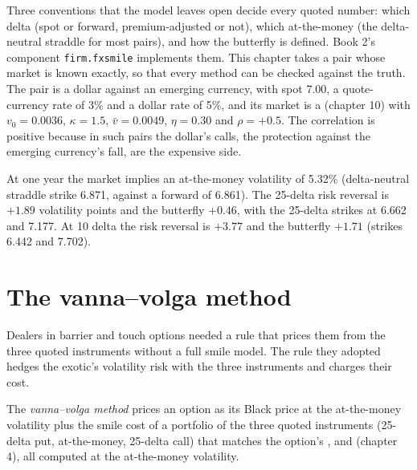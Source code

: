 Three conventions that the model leaves open decide every quoted number: which delta (spot or forward, premium-adjusted or not),
which at-the-money (the delta-neutral straddle for most pairs), and how the butterfly is defined. Book 2's component
\texttt{firm.fxsmile} implements them. This chapter takes a pair whose market is known exactly, so that every method can be checked
against the truth. The pair is a dollar against an emerging currency, with spot 7.00, a quote-currency rate of 3\% and a dollar rate
of 5\%, and its market is a  (chapter 10) with $v_0=0.0036$, $\kappa=1.5$, $\bar v=0.0049$, $\eta=0.30$ and $\rho=+0.5$. The
correlation is positive because in such pairs the dollar's calls, the protection against the emerging currency's fall, are the
expensive side.

\begin{example}\label{ex:dv:fx-derivatives:quotes}
At one year the market implies an at-the-money volatility of 5.32\% (delta-neutral straddle strike 6.871, against a forward of 6.861). The
25-delta risk reversal is $+1.89$ volatility points and the butterfly $+0.46$, with the 25-delta strikes at 6.662 and 7.177. At 10 delta
the risk reversal is $+3.77$ and the butterfly $+1.71$ (strikes 6.442 and 7.702).
\end{example}

\section{The vanna--volga method}

Dealers in barrier and touch options needed a rule that prices them from the three quoted instruments without a full smile
model. The rule they adopted hedges the exotic's volatility risk with the three
instruments and charges their cost.

\begin{definition}\label{def:dv:fx-derivatives:vv}
The \emph{vanna--volga method} prices an option as its Black price at the at-the-money volatility plus
the smile cost of a portfolio of the three quoted instruments (25-delta put, at-the-money, 25-delta call) that matches the option's
,  and  (chapter 4), all computed at the at-the-money volatility.
\end{definition}

